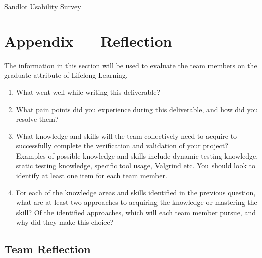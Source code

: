 \documentclass[12pt, titlepage]{article}
\begin{document}
\href{https://forms.office.com/Pages/ResponsePage.aspx?id=B2M3RCm0rUKMJSjNSW9HcodvkeIlB8lOjrmyIWuVT7dUQ0hBNFRVTjFHWVhITDIzSklZRDRYTVZRMi4u}{Sandlot Usability Survey}

\newpage{}
\section*{Appendix --- Reflection}

The information in this section will be used to evaluate the team members on the
graduate attribute of Lifelong Learning.



\begin{enumerate}
  \item What went well while writing this deliverable? 
  \item What pain points did you experience during this deliverable, and how
    did you resolve them?
  \item What knowledge and skills will the team collectively need to acquire to
  successfully complete the verification and validation of your project?
  Examples of possible knowledge and skills include dynamic testing knowledge,
  static testing knowledge, specific tool usage, Valgrind etc.  You should look to
  identify at least one item for each team member.
  \item For each of the knowledge areas and skills identified in the previous
  question, what are at least two approaches to acquiring the knowledge or
  mastering the skill?  Of the identified approaches, which will each team
  member pursue, and why did they make this choice?
\end{enumerate}

\subsection*{Team Reflection}
\end{document}

